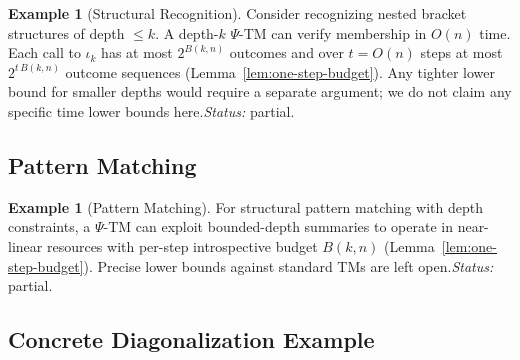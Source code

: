 \documentclass[11pt]{article}
\theoremstyle{definition}
\newtheorem{example}[theorem]{Example}
\newcommand{\PSi}{\Psi}
\begin{document}
\begin{example}[Structural Recognition]
Consider recognizing nested bracket structures of depth $\leq k$. A depth-$k$ $\PSi$-TM can verify membership in $O(n)$ time. Each call to $\iota_k$ has at most $2^{B(k,n)}$ outcomes and over $t=O(n)$ steps at most $2^{t\,B(k,n)}$ outcome sequences (Lemma~\ref{lem:one-step-budget}). Any tighter lower bound for smaller depths would require a separate argument; we do not claim any specific time lower bounds here.\;\emph{Status:} partial.
\end{example}

\subsection{Pattern Matching}

\begin{example}[Pattern Matching]
For structural pattern matching with depth constraints, a $\PSi$-TM can exploit bounded-depth summaries to operate in near-linear resources with per-step introspective budget $B(k,n)$ (Lemma~\ref{lem:one-step-budget}). Precise lower bounds against standard TMs are left open.\;\emph{Status:} partial.
\end{example}

\subsection{Concrete Diagonalization Example}
\end{document}
